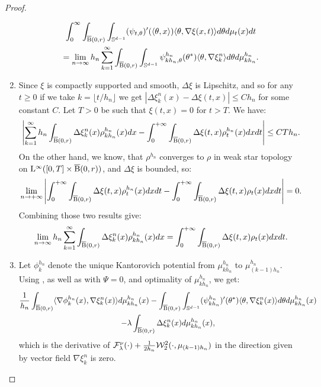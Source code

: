 \begin{proof}
\begin{enumerate}[wide, labelwidth=!, labelindent=0pt,label=(\arabic*)]
\begin{multline} \label{thm:cont_proof_part2}
\int_0^{\infty} \int_{\operatorname{\overline{B}}(0,r)} \int_{\mathbb{S}^{d-1}} (\psi_{t, \theta})' (\langle \theta, x \rangle ) \langle \theta , \nabla \xi (x, t) \rangle d\theta d\mu_t(x) dt \\
= \lim_{n \rightarrow \infty} h_n \sum_{k=1}^{\infty} \int_{\operatorname{\overline{B}}(0,r)} \int_{\mathbb{S}^{d-1}} \psi_{kh_n, \theta}^{h_n} (\theta^{*}) \langle \theta, \nabla \xi_{k}^n \rangle d \theta d\mu_{kh_n}^{h_n}.
\end{multline}
\item  Since $\xi$ is compactly supported and smooth, $\Delta \xi$ is Lipschitz, and so for any $ t \geq 0$ if we take $k = \lfloor t/h_n \rfloor$ we get $| \Delta \xi_k^n(x) - \Delta \xi(t,x) | \leq C h_n$ for some constant $C$. Let $T > 0$ be such that $\xi(t,x) = 0 $ for $t > T$. We have:
\[
\left| \sum_{k=1}^{\infty} h_n \int_{\operatorname{\overline{B}}(0,r)} \Delta \xi_k^n(x) \rho_{kh_n}^{h_n}(x) dx - \int_{0}^{+\infty} \int_{\operatorname{\overline{B}}(0,r)} \Delta \xi(t,x) \rho_{t}^{h_n}(x) dx dt \right| \leq CTh_n .
\]
On the other hand,  we know, that $\rho^{h_n}$ converges to $\rho$ in weak star topology on $\mathrm{L}^{\infty}([0,T] \times \operatorname{\overline{B}}(0,r))$, and $\Delta \xi$ is bounded, so:
\[
\lim_{n \to +\infty}\left| \int_{0}^{+\infty} \int_{\operatorname{\overline{B}}(0,r)} \Delta \xi(t,x) \rho_{t}^{h_n}(x) dx dt - \int_{0}^{+\infty} \int_{\operatorname{\overline{B}}(0,r)} \Delta \xi (t,x) \rho_t(x) dx dt \right|= 0.
\]
Combining those two results give:
\begin{equation} \label{thm:cont_proof_part3}
\lim_{n \rightarrow \infty} h_n \sum_{k=1}^{\infty} \int_{\operatorname{\overline{B}}(0,r)} \Delta \xi_k^n(x) \rho_{kh_n}^{h_n}(x) dx = \int_{0}^{+\infty} \int_{\operatorname{\overline{B}}(0,r)} \Delta \xi (t,x) \rho_t(x) dx dt.
\end{equation}

\item 
  Let $\phi_{k}^{h_n}$ denote the unique Kantorovich potential from $\mu_{kh_n}^{h_n}$ to $\mu_{(k-1)h_n}^{h_n}$. Using  \cite[Propositions 1.5.7 and 5.1.7]{bonnotte2013unidimensional}, as well as \cite[Equation (38)]{jordan1998variational} with $\Psi = 0$, and optimality of $\mu_{kh_n}^{h_n}$, we get:
\begin{multline} \label{thm:cont_proof_eq0}
\frac{1}{h_n} \int_{\operatorname{\overline{B}}(0,r)} \langle \nabla \phi_k^{h_n}(x) , \nabla \xi_{k}^n(x) \rangle d\mu_{kh_n}^{h_n}(x)   - \int_{\operatorname{\overline{B}}(0,r)} \int_{\mathbb{S}^{d-1}} (\psi_{kh_n}^{h_n})'(\theta^{*}) \langle \theta, \nabla \xi_k^n(x) \rangle d\theta d\mu_{kh_n}^{h_n}(x)\\ - \lambda \int_{\operatorname{\overline{B}}(0,r)}   \Delta \xi_k^n(x) d\mu_{kh_n}^{h_n}(x) ,
\end{multline}
which is the derivative of $\mathcal{F}^{\nu}_{\lambda}(\cdot) + \frac{1}{2h_n}{\cal W}_2^2(\cdot, \mu_{(k-1)h_n})$ in the direction given by vector field $\nabla \xi_k^n$ is zero.


\end{enumerate}
\end{proof}
